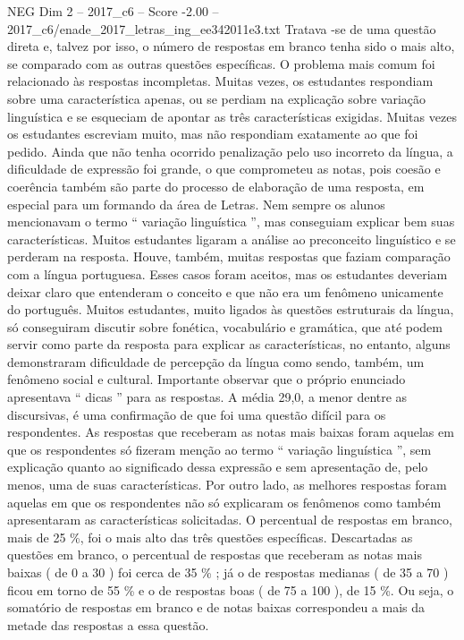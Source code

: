 \begin{textsample}{NEG Dim 2 – 2017\_c6 – Score -2.00 – 2017\_c6/enade\_2017\_letras\_ing\_ee342011e3.txt}
Tratava -se de uma questão direta e, talvez por isso, o número de respostas em branco tenha sido o mais alto, se comparado com as outras questões específicas.
O problema mais comum foi relacionado às respostas incompletas.
Muitas vezes, os estudantes respondiam sobre uma característica apenas, ou se perdiam na explicação sobre variação linguística e se esqueciam de apontar as três características exigidas.
Muitas vezes os estudantes escreviam muito, mas não respondiam exatamente ao que foi pedido.
Ainda que não tenha ocorrido penalização pelo uso incorreto da língua, a dificuldade de expressão foi grande, o que comprometeu as notas, pois coesão e coerência também são parte do processo de elaboração de uma resposta, em especial para um formando da área de Letras.
Nem sempre os alunos mencionavam o termo “ variação linguística ”, mas conseguiam explicar bem suas características.
Muitos estudantes ligaram a análise ao preconceito linguístico e se perderam na resposta.
Houve, também, muitas respostas que faziam comparação com a língua portuguesa.
Esses casos foram aceitos, mas os estudantes deveriam deixar claro que entenderam o conceito e que não era um fenômeno unicamente do português.
Muitos estudantes, muito ligados às questões estruturais da língua, só conseguiram discutir sobre fonética, vocabulário e gramática, que até podem servir como parte da resposta para explicar as características, no entanto, alguns demonstraram dificuldade de percepção da língua como sendo, também, um fenômeno social e cultural.
Importante observar que o próprio enunciado apresentava “ dicas ” para as respostas.
A média 29,0, a menor dentre as discursivas, é uma confirmação de que foi uma questão difícil para os respondentes.
As respostas que receberam as notas mais baixas foram aquelas em que os respondentes só fizeram menção ao termo “ variação linguística ”, sem explicação quanto ao significado dessa expressão e sem apresentação de, pelo menos, uma de suas características.
Por outro lado, as melhores respostas foram aquelas em que os respondentes não só explicaram os fenômenos como também apresentaram as características solicitadas.
O percentual de respostas em branco, mais de 25 \%, foi o mais alto das três questões específicas.
Descartadas as questões em branco, o percentual de respostas que receberam as notas mais baixas ( de 0 a 30 ) foi cerca de 35 \% ; já o de respostas medianas ( de 35 a 70 ) ficou em torno de 55 \% e o de respostas boas ( de 75 a 100 ), de 15 \%.
Ou seja, o somatório de respostas em branco e de notas baixas correspondeu a mais da metade das respostas a essa questão.

\end{textsample}
